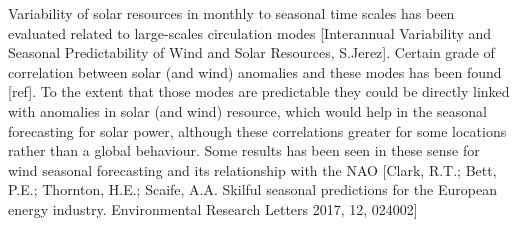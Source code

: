 Variability of solar resources in monthly to seasonal time scales has been evaluated related to large-scales circulation modes [Interannual Variability and Seasonal Predictability of Wind and Solar Resources, S.Jerez]. Certain grade of correlation between solar (and wind) anomalies and these modes has been found [ref]. To the extent that those modes are predictable they could be directly linked with anomalies in solar (and wind) resource, which would help in the seasonal forecasting for solar power, although these correlations greater for some locations rather than a global behaviour. Some results has been seen in these sense for wind seasonal forecasting and its relationship with the NAO [Clark, R.T.; Bett, P.E.; Thornton, H.E.; Scaife, A.A. Skilful seasonal predictions for the European energy industry. Environmental Research Letters 2017, 12, 024002]




